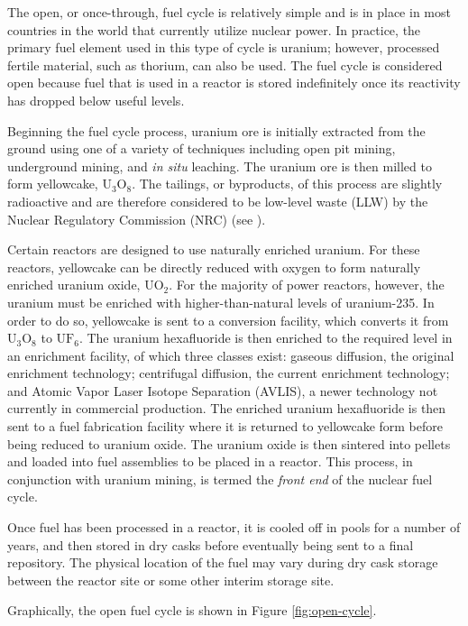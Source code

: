 The open, or once-through, fuel cycle is relatively simple and is in place in
most countries in the world that currently utilize nuclear power. In practice,
the primary fuel element used in this type of cycle is uranium; however,
processed fertile material, such as thorium, can also be used. The fuel cycle is
considered open because fuel that is used in a reactor is stored indefinitely
once its reactivity has dropped below useful levels.

Beginning the fuel cycle process, uranium ore is initially extracted from the
ground using one of a variety of techniques including open pit mining,
underground mining, and \textit{in situ} leaching. The uranium ore is then
milled to form yellowcake, $\mathrm{U_3O_8}$. The tailings, or byproducts, of
this process are slightly radioactive and are therefore considered to be
low-level waste (LLW) by the Nuclear Regulatory Commission (NRC)
(see \cite{nrc_10_1985}).

Certain reactors are designed to use naturally enriched uranium. For these
reactors, yellowcake can be directly reduced with oxygen to form naturally
enriched uranium oxide, $\mathrm{UO_2}$. For the majority of power reactors,
however, the uranium must be enriched with higher-than-natural levels of
uranium-235. In order to do so, yellowcake is sent to a conversion facility,
which converts it from $\mathrm{U_3O_8}$ to $\mathrm{UF_6}$. The uranium
hexafluoride is then enriched to the required level in an enrichment facility,
of which three classes exist: gaseous diffusion, the original enrichment
technology; centrifugal diffusion, the current enrichment technology; and Atomic
Vapor Laser Isotope Separation (AVLIS), a newer technology not currently in
commercial production. The enriched uranium hexafluoride is then sent to a fuel
fabrication facility where it is returned to yellowcake form before being
reduced to uranium oxide. The uranium oxide is then sintered into pellets and
loaded into fuel assemblies to be placed in a reactor. This process, in
conjunction with uranium mining, is termed the \textit{front end} of the nuclear
fuel cycle.

Once fuel has been processed in a reactor, it is cooled off in pools for a
number of years, and then stored in dry casks before eventually being sent to a
final repository. The physical location of the fuel may vary during dry cask
storage between the reactor site or some other interim storage site.

Graphically, the open fuel cycle is shown in Figure \ref{fig:open-cycle}.

